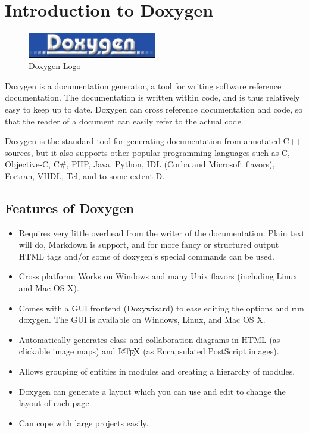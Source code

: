 \section{Introduction to Doxygen}
\begin{figure}[!ht]
\centering
\includegraphics[width=0.5\textwidth]{images/doxygen_logo.png}                   
\caption{Doxygen Logo}
\hspace{-1.5em}
\end{figure}
\noindent Doxygen is a documentation generator, a tool for writing software reference 
documentation. The documentation is written within code, and is thus 
relatively easy to keep up to date. Doxygen can cross reference 
documentation and code, so that the reader of a document can easily 
refer to the actual code.

Doxygen is the standard tool for generating documentation from
annotated C++ sources, but it also supports other popular programming
languages such as C, Objective-C, C\#, PHP, Java, Python, IDL (Corba
and Microsoft flavors), Fortran, VHDL, Tcl, and to some extent D.

\subsection{Features of Doxygen}
\begin{itemize}
\item Requires very little overhead from the writer of the documentation. 
Plain text will do, Markdown is support, and for more fancy or structured 
output HTML tags and/or some of doxygen's special commands can be used.
\item Cross platform: Works on Windows and many Unix flavors (including 
Linux and Mac OS X).
\item Comes with a GUI frontend (Doxywizard) to ease editing the options 
and run doxygen. The GUI is available on Windows, Linux, and Mac OS X.
\item Automatically generates class and collaboration diagrams in HTML 
(as clickable image maps) and $\mbox{\LaTeX}$ (as Encapsulated PostScript 
images).
\item Allows grouping of entities in modules and creating a hierarchy 
of modules.
\item Doxygen can generate a layout which you can use and edit to change 
the layout of each page.
\item Can cope with large projects easily.
\end{itemize}

